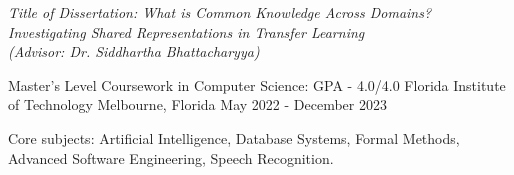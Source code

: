 \begin{cventries}
{\begin{cvitems}
\item \emph{Title of Dissertation: \emph{What is Common Knowledge Across Domains? Investigating Shared Representations in Transfer Learning} \\(Advisor: Dr. Siddhartha Bhattacharyya)}
\end{cvitems}
}
\cventry
{Master's Level Coursework in Computer Science: GPA - 4.0/4.0}
{Florida Institute of Technology}
{Melbourne, Florida}
{May 2022 - December 2023}
{
\begin{cvitems}
    \item Core subjects: Artificial Intelligence, Database Systems, Formal Methods, Advanced Software Engineering, Speech Recognition.
\end{cvitems}
}
\end{cventries}

